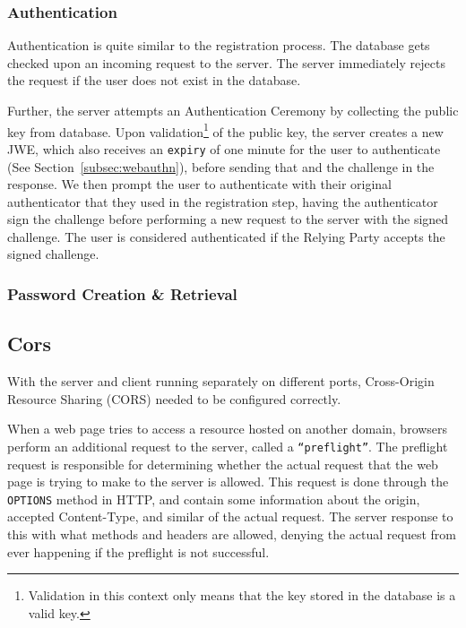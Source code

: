 \subsubsection{Authentication}
Authentication is quite similar to the registration process.
The database gets checked upon an incoming request to the server.
The server immediately rejects the request if the user does not exist in the
database.

Further, the server attempts an Authentication Ceremony by collecting the
public key from database.
Upon validation\footnote{
  Validation in this context only means that the key stored in the database
  is a valid key.
} of the public key, the server creates a new JWE, which also receives an
\texttt{expiry} of one minute for the user to authenticate (See
Section~\ref{subsec:webauthn}), before sending that and the challenge in the
response.
We then prompt the user to authenticate with their original authenticator
that they used in the registration step, having the authenticator sign the
challenge before performing a new request to the server with the signed
challenge.
The user is considered authenticated if the Relying Party accepts the signed
challenge.




\subsubsection{Password Creation \& Retrieval}

\subsection{Cors}\label{subsec:cors}
With the server and client running separately on different ports, Cross-Origin
Resource Sharing (CORS) needed to be configured correctly.

When a web page tries to access a resource hosted on another domain, browsers
perform an additional request to the server, called a \texttt{``preflight''}.
The preflight request is responsible for determining whether the actual
request that the web page is trying to make to the server is allowed.
This request is done through the \texttt{OPTIONS} method in HTTP, and contain
some information about the origin, accepted Content-Type, and similar of the
actual request.
The server response to this with what methods and headers are allowed,
denying the actual request from ever happening if the preflight is not
successful.


